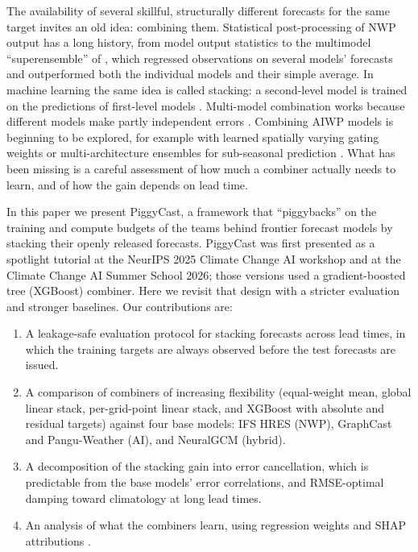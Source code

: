 \documentclass[twocol]{ametsocV6.1}
\begin{document}
The availability of several skillful, structurally different forecasts for the same target invites an old idea: combining them. Statistical post-processing of NWP output has a long history, from model output statistics \citep{glahn1972mos} to the multimodel ``superensemble'' of \citet{krishnamurti1999superensemble}, which regressed observations on several models' forecasts and outperformed both the individual models and their simple average. In machine learning the same idea is called stacking: a second-level model is trained on the predictions of first-level models \citep{wolpert1992stacked, breiman1996stacked}. Multi-model combination works because different models make partly independent errors \citep{hagedorn2005multimodel}. Combining AIWP models is beginning to be explored, for example with learned spatially varying gating weights \citep{chakraborty2025mowe} or multi-architecture ensembles for sub-seasonal prediction \citep{weyn2024ensemble}. What has been missing is a careful assessment of how much a combiner actually needs to learn, and of how the gain depends on lead time.

In this paper we present PiggyCast, a framework that ``piggybacks'' on the training and compute budgets of the teams behind frontier forecast models by stacking their openly released forecasts. PiggyCast was first presented as a spotlight tutorial at the NeurIPS 2025 Climate Change AI workshop and at the Climate Change AI Summer School 2026; those versions used a gradient-boosted tree (XGBoost) combiner. Here we revisit that design with a stricter evaluation and stronger baselines. Our contributions are:
\begin{enumerate}
\item A leakage-safe evaluation protocol for stacking forecasts across lead times, in which the training targets are always observed before the test forecasts are issued.
\item A comparison of combiners of increasing flexibility (equal-weight mean, global linear stack, per-grid-point linear stack, and XGBoost with absolute and residual targets) against four base models: IFS HRES (NWP), GraphCast and Pangu-Weather (AI), and NeuralGCM (hybrid).
\item A decomposition of the stacking gain into error cancellation, which is predictable from the base models' error correlations, and RMSE-optimal damping toward climatology at long lead times.
\item An analysis of what the combiners learn, using regression weights and SHAP attributions \citep{lundberg2017shap}.
\end{enumerate}
\end{document}
